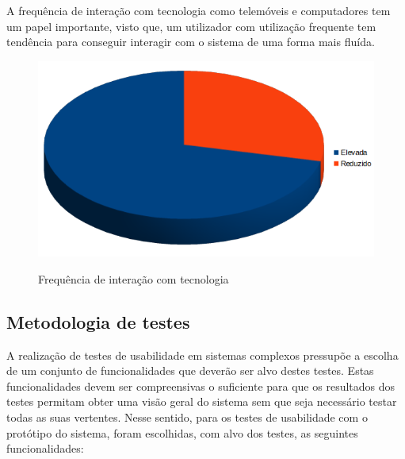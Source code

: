 \documentclass[11pt, a4paper]{article}
\begin{document}
A frequência de interação com tecnologia como telemóveis e computadores tem um papel importante, visto que, um utilizador com utilização frequente tem tendência para conseguir interagir com o sistema de uma forma mais fluída. 
\begin{figure}[H]
    \centering
    \includegraphics[scale=0.5]{images/frequenciautilizacao.png}
    \label{figFrequencia}
    \caption{Frequência de interação com tecnologia}
\end{figure}


\subsection{Metodologia de testes}
A realização de testes de usabilidade em sistemas complexos pressupõe a escolha de um
conjunto de funcionalidades que deverão ser alvo destes testes. Estas funcionalidades devem ser compreensivas
o suficiente para que os resultados dos testes permitam obter uma visão geral do sistema sem que seja necessário
testar todas as suas vertentes. Nesse sentido, para os testes de usabilidade com o protótipo do sistema, foram
escolhidas, com alvo dos testes, as seguintes funcionalidades:
\end{document}
